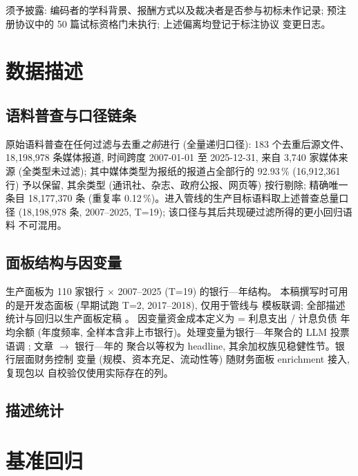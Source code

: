 须予披露: 编码者的学科背景、报酬方式以及裁决者是否参与初标未作记录;
预注册协议中的 50 篇试标资格门未执行; 上述偏离均登记于标注协议
变更日志。

\section{数据描述}\label{sec:data}

\subsection{语料普查与口径链条}
原始语料普查在任何过滤与去重\emph{之前}进行 (全量递归口径):
183 个去重后源文件、18{,}198{,}978 条媒体报道, 时间跨度
2007-01-01 至 2025-12-31, 来自 3{,}740 家媒体来源 (全类型未过滤);
其中媒体类型为报纸的报道占全部行的 92.93\,\% (16{,}912{,}361 行)
予以保留, 其余类型 (通讯社、杂志、政府公报、网页等) 按行剔除;
精确唯一条目 18{,}177{,}370 条 (重复率 0.12\,\%)。进入管线的生产目标语料取上述普查总量口径 (18{,}198{,}978 条,
2007--2025, T=19); 该口径与其后共现硬过滤所得的更小回归语料
不可混用。

\subsection{面板结构与因变量}
生产面板为 110 家银行 $\times$ 2007--2025 (T=19) 的银行—年结构。
本稿撰写时可用的是开发态面板 (早期试跑 T=2, 2017--2018), 仅用于管线与
模板联调; 全部描述统计与回归以生产面板定稿
。
因变量资金成本定义为  = 利息支出 / 计息负债
年均余额 (年度频率, 全样本含非上市银行)。处理变量为银行—年聚合的
LLM 投票语调 ; 文章 $\to$ 银行—年的
聚合以等权为 headline, 其余加权族见稳健性节。银行层面财务控制
变量 (规模、资本充足、流动性等) 随财务面板 enrichment 接入,
复现包以  自校验仅使用实际存在的列。

\subsection{描述统计}

\section{基准回归}\label{sec:main}

